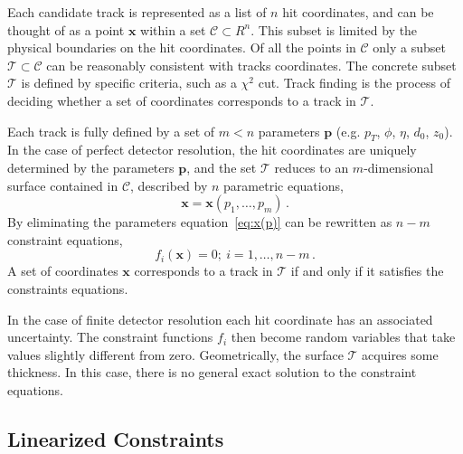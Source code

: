 \documentclass[10pt,a4paper]{article}
\begin{document}
Each candidate track is represented as a list of $n$ hit coordinates, and can be thought of as a point $\mathbf{x}$ within a set $\mathcal{C} \subset R^n$. This subset is limited by the physical boundaries on the hit coordinates. Of all the points in $\mathcal{C}$ only a subset $\mathcal{T} \subset \mathcal{C}$ can be reasonably consistent with tracks coordinates. The concrete subset $\mathcal{T}$ is defined by specific criteria, such as a $\chi^2$ cut. Track finding is the process of deciding whether a set of coordinates corresponds to a track in $\mathcal{T}$.

Each track is fully defined by a set of $m < n$ parameters $\mathbf{p}$ (e.g. $p_T$, $\phi$, $\eta$, $d_0$, $z_0$). In the case of perfect detector resolution, the hit coordinates are uniquely determined by the parameters $\mathbf{p}$, and the set $\mathcal{T}$ reduces to an $m$-dimensional surface contained in $\mathcal{C}$, described by $n$ parametric equations,
\begin{equation}
\mathbf{x} = \mathbf{x}(p_1, \dots, p_m)\, .
\label{eq:x(p)}
\end{equation}
By eliminating the parameters equation~\ref{eq:x(p)} can be rewritten as $n - m$ constraint equations,
\begin{equation}
f_i(\mathbf{x}) = 0;\ i = 1, \dots, n-m\, .
\label{eq:constraints}
\end{equation}
A set of coordinates $\mathbf{x}$ corresponds to a track in $\mathcal{T}$ if and only if it satisfies the constraints equations.

In the case of finite detector resolution each hit coordinate has an associated uncertainty. The constraint functions ${f_i}$ then become random variables that take values slightly different from zero. Geometrically, the surface $\mathcal{T}$ acquires some thickness. In this case, there is no general exact solution to the constraint equations.

\subsection{Linearized Constraints}
\end{document}
